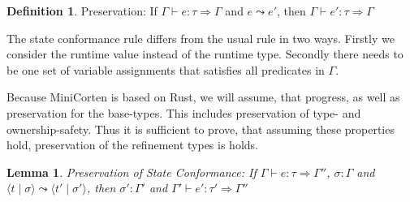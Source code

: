 \documentclass{book}
\newcommand{\tuple}[2]{\langle #1 \mid #2 \rangle}
\newtheorem{lemma}[theorem]{Lemma}
\theoremstyle{definition}
\newtheorem{definition}[theorem]{Definition}
\begin{document}
\begin{definition}
  Preservation: If $\Gamma \vdash e : \tau \Rightarrow \Gamma$ and $e \leadsto e'$, then $\Gamma \vdash e' : \tau \Rightarrow \Gamma$
\end{definition}

The state conformance rule differs from the usual rule in two ways. Firstly we consider the runtime value instead of the runtime type. Secondly there needs to be one set of variable assignments that satisfies all predicates in $\Gamma$.

Because MiniCorten is based on Rust, we will assume, that progress, as well as preservation for the base-types. This includes preservation of type- and ownership-safety. Thus it is sufficient to prove, that assuming these properties hold, preservation of the refinement types is holds.


\begin{lemma}
  Preservation of State Conformance: If $\Gamma \vdash e : \tau \Rightarrow \Gamma''$, $\sigma : \Gamma$ and $\tuple{t}{\sigma} \leadsto \tuple{t'}{\sigma'}$, then  $\sigma' : \Gamma'$ and $\Gamma' \vdash e' : \tau' \Rightarrow \Gamma''$
\end{lemma}
\end{document}
